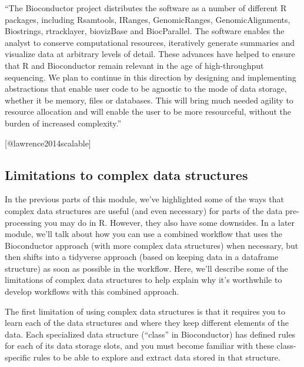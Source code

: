 \documentclass[]{tufte-book}
\begin{document}
\begin{marginfigure}
``The Bioconductor project distributes the software as a number of
different R packages, including Rsamtools, IRanges, GenomicRanges,
GenomicAlignments, Biostrings, rtracklayer, biovizBase and BiocParallel.
The software enables the analyst to conserve computational resources,
iteratively generate summaries and visualize data at arbitrary levels of
detail. These advances have helped to ensure that R and Bioconductor
remain relevant in the age of high-throughput sequencing. We plan to
continue in this direction by designing and implementing abstractions
that enable user code to be agnostic to the mode of data storage,
whether it be memory, files or databases. This will bring much needed
agility to resource allocation and will enable the user to be more
resourceful, without the burden of increased complexity.''

{[}@lawrence2014scalable{]}
\end{marginfigure}

\hypertarget{limitations-to-complex-data-structures}{%
\subsection{Limitations to complex data structures}\label{limitations-to-complex-data-structures}}

In the previous parts of this module, we've highlighted some of the ways that
complex data structures are useful (and even necessary) for parts of the data
pre-processing you may do in R. However, they also have some downsides. In a later
module, we'll talk about how you can use a combined workflow that uses the
Bioconductor approach (with more complex data structures) when necessary, but then
shifts into a tidyverse approach (based on keeping data in a dataframe
structure) as soon as possible in the workflow. Here, we'll describe some of the
limitations of complex data structures to help explain why it's worthwhile to
develop workflows with this combined approach.

The first limitation of using complex data structures is that it requires you to
learn each of the data structures and where they keep different elements of the
data. Each specialized data structure (``class'' in Bioconductor) has defined
rules for each of its data storage slots, and you must become familiar with
these class-specific rules to be able to explore and extract data stored in that
structure.
\end{document}
